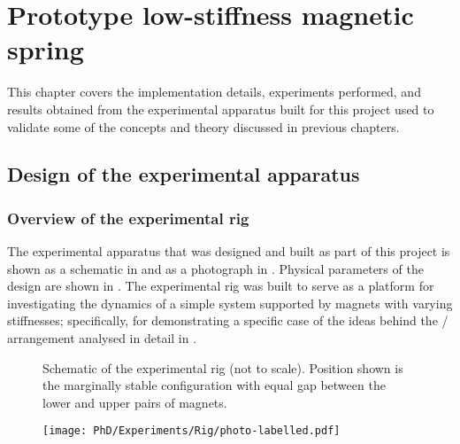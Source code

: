 \documentclass[11pt,a4paper]{memoir}
\begin{document}
\chapter{Prototype low-stiffness magnetic spring}

This chapter covers the implementation details, experiments performed, and results obtained from the experimental apparatus built for this project used to validate some of the concepts and theory discussed in previous chapters.

\section{Design of the experimental apparatus}

\subsection{Overview of the experimental rig}

The experimental apparatus that was designed and built as part of this project
is shown as a schematic in  and as a photograph in
. Physical parameters of the design are shown in
. The experimental rig was built to serve as a platform for
investigating the dynamics of a simple system supported by magnets with
varying stiffnesses; specifically, for demonstrating a specific case of
the ideas behind the \qzs/ arrangement analysed in detail in .

\begin{figure}
  \begin{wide}
  \end{wide}
  \caption[Schematic of the experimental rig.]{
    Schematic of the experimental rig (not to scale). Position shown is
    the marginally stable configuration with equal gap between the lower
    and upper pairs of magnets.}
\end{figure}

\begin{figure}
  \texttt{[image: PhD/Experiments/Rig/photo-labelled.pdf]}
\end{figure}
\end{document}
